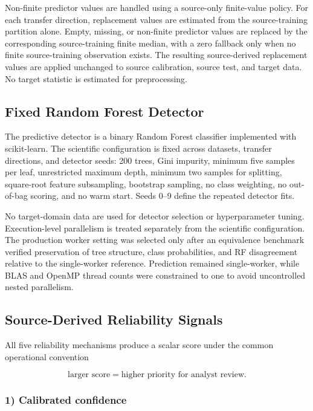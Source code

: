 \documentclass[conference]{IEEEtran}
\begin{document}
Non-finite predictor values are handled using a source-only finite-value policy. For each transfer direction, replacement values are estimated from the source-training partition alone. Empty, missing, or non-finite predictor values are replaced by the corresponding source-training finite median, with a zero fallback only when no finite source-training observation exists. The resulting source-derived replacement values are applied unchanged to source calibration, source test, and target data. No target statistic is estimated for preprocessing.

\subsection{Fixed Random Forest Detector}

The predictive detector is a binary Random Forest classifier implemented with scikit-learn. The scientific configuration is fixed across datasets, transfer directions, and detector seeds: 200 trees, Gini impurity, minimum five samples per leaf, unrestricted maximum depth, minimum two samples for splitting, square-root feature subsampling, bootstrap sampling, no class weighting, no out-of-bag scoring, and no warm start. Seeds 0--9 define the repeated detector fits.

No target-domain data are used for detector selection or hyperparameter tuning. Execution-level parallelism is treated separately from the scientific configuration. The production worker setting was selected only after an equivalence benchmark verified preservation of tree structure, class probabilities, and RF disagreement relative to the single-worker reference. Prediction remained single-worker, while BLAS and OpenMP thread counts were constrained to one to avoid uncontrolled nested parallelism.

\subsection{Source-Derived Reliability Signals}

All five reliability mechanisms produce a scalar score under the common operational convention

\[
\text{larger score} = \text{higher priority for analyst review}.
\]

\subsubsection{1) Calibrated confidence}
\end{document}
